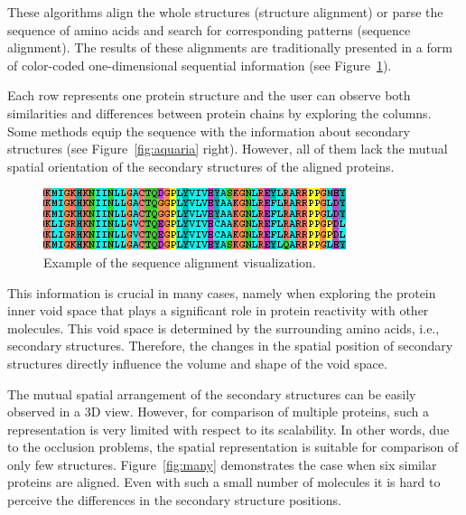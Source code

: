 \documentclass[twocolumn]{bmcart}%
\begin{document}
These algorithms align the whole structures (structure alignment) or parse the sequence of amino acids and search for corresponding patterns (sequence alignment). 
The results of these alignments are traditionally presented in a form of color-coded one-dimensional sequential information (see Figure~\ref{fig:align}).

Each row represents one protein structure and the user can observe both similarities and differences between protein chains by exploring the columns.
Some methods equip the sequence with the information about secondary structures (see Figure~\ref{fig:aquaria} right).
However, all of them lack the mutual spatial orientation of the secondary structures of the aligned proteins.

\begin{figure}[ht]
  \centering
  \includegraphics[width=0.9\columnwidth]{pics/align.png}
  \caption{Example of the sequence alignment visualization.}
  \label{fig:align}
\end{figure}

This information is crucial in many cases, namely when exploring the protein inner void space that plays a significant role in protein reactivity with other molecules.
This void space is determined by the surrounding amino acids, i.e., secondary structures. 
Therefore, the changes in the spatial position of secondary structures directly influence the volume and shape of the void space.



The mutual spatial arrangement of the secondary structures can be easily observed in a 3D view. 
However, for comparison of multiple proteins, such a representation is very limited with respect to its scalability.
In other words, due to the occlusion problems, the spatial representation is suitable for comparison of only few structures. 
Figure~\ref{fig:many} demonstrates the case when six similar proteins are aligned.
Even with such a small number of molecules it is hard to perceive the differences in the secondary structure positions.

\end{document}

